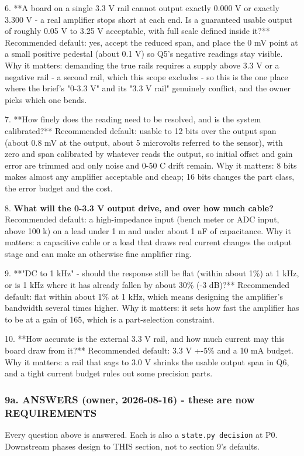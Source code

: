 \documentclass[11pt,a4paper]{article}
\begin{document}
6. {*}{*}A board on a single 3.3 V rail cannot output exactly 0.000 V or exactly 3.300 V - a real amplifier stops short at each end. Is a guaranteed usable output of roughly 0.05 V to 3.25 V acceptable, with full scale defined inside it?{*}{*} Recommended default: yes, accept the reduced span, and place the 0 mV point at a small positive pedestal (about 0.1 V) so Q5's negative readings stay visible. Why it matters: demanding the true rails requires a supply above 3.3 V or a negative rail - a second rail, which this scope excludes - so this is the one place where the brief's "0-3.3 V" and its "3.3 V rail" genuinely conflict, and the owner picks which one bends.

7. {*}{*}How finely does the reading need to be resolved, and is the system calibrated?{*}{*} Recommended default: usable to 12 bits over the output span (about 0.8 mV at the output, about 5 microvolts referred to the sensor), with zero and span calibrated by whatever reads the output, so initial offset and gain error are trimmed and only noise and 0-50 C drift remain. Why it matters: 8 bits makes almost any amplifier acceptable and cheap; 16 bits changes the part class, the error budget and the cost.

8. \textbf{What will the 0-3.3 V output drive, and over how much cable?} Recommended default: a high-impedance input (bench meter or ADC input, above 100 k) on a lead under 1 m and under about 1 nF of capacitance. Why it matters: a capacitive cable or a load that draws real current changes the output stage and can make an otherwise fine amplifier ring.

9. {*}{*}"DC to 1 kHz" - should the response still be flat (within about 1\%) at 1 kHz, or is 1 kHz where it has already fallen by about 30\% (-3 dB)?{*}{*} Recommended default: flat within about 1\% at 1 kHz, which means designing the amplifier's bandwidth several times higher. Why it matters: it sets how fast the amplifier has to be at a gain of 165, which is a part-selection constraint.

10. {*}{*}How accurate is the external 3.3 V rail, and how much current may this board draw from it?{*}{*} Recommended default: 3.3 V +-5\% and a 10 mA budget. Why it matters: a rail that sags to 3.0 V shrinks the usable output span in Q6, and a tight current budget rules out some precision parts.

\subsubsection*{9a. ANSWERS (owner, 2026-08-16) - these are now REQUIREMENTS}
Every question above is answered. Each is also a \texttt{state.py decision} at P0. Downstream phases design to THIS section, not to section 9's defaults.
\end{document}
